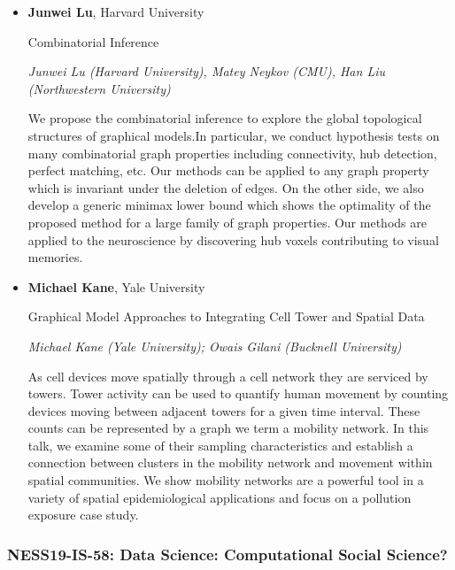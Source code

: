 \begin{itemize}
\item \textbf{Junwei Lu}, Harvard University

Combinatorial Inference

\emph{\footnotesize Junwei Lu (Harvard University), Matey Neykov (CMU), Han Liu (Northwestern University)}

We propose the combinatorial inference to explore the global topological structures of graphical models.In particular, we conduct hypothesis tests on many combinatorial graph properties including connectivity, hub detection, perfect matching, etc. Our methods can be applied to any graph property which is invariant under the deletion of edges. On the other side, we also develop a generic minimax lower bound which shows the optimality of the proposed method for a large family of graph properties. Our methods are applied to the neuroscience by discovering hub voxels contributing to visual memories.

\item \textbf{Michael Kane}, Yale University

Graphical Model Approaches to Integrating Cell Tower and Spatial Data

\emph{\footnotesize Michael Kane (Yale University); Owais Gilani (Bucknell University)}

As cell devices move spatially through a cell network they are serviced by towers. Tower activity can be used to quantify human movement by counting devices moving between adjacent towers for a given time interval. These counts can be represented by a graph we term a mobility network. In this talk, we examine some of their sampling characteristics and establish a connection between clusters in the mobility network and movement within spatial communities. We show mobility networks are a powerful tool in a variety of spatial epidemiological applications and focus on a pollution exposure case study.

\end{itemize}

\subsubsection*{NESS19-IS-58: Data Science: Computational Social Science?}

